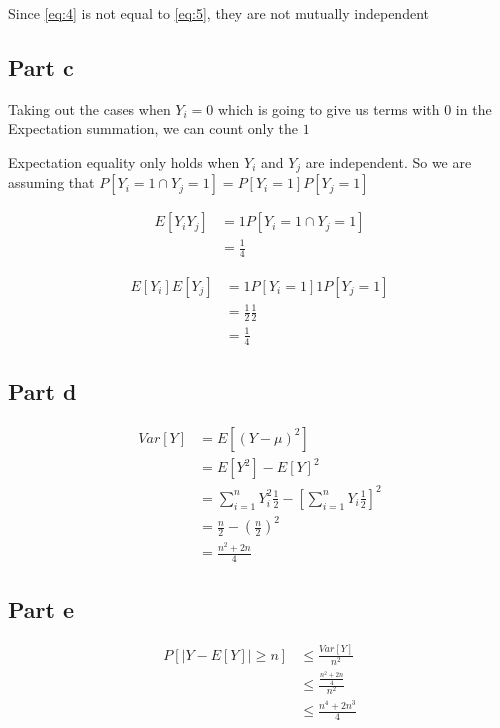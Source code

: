 \documentclass[12pt, a4paper]{article}
\begin{document}
Since \ref{eq:4} is not equal to \ref{eq:5}, they are not mutually independent

\subsection{Part c}
Taking out the cases when $Y_i = 0$ which is going to give us terms with $0$ in
the Expectation summation, we can count only the $1$

Expectation equality only holds when $Y_i$ and $Y_j$ are independent. So we are
assuming that $P[Y_i = 1 \cap Y_j = 1] = P[Y_i = 1]P[Y_j = 1]$

\begin{subequations}
  \begin{align}
    E[Y_iY_j] &= 1 P[Y_i=1 \cap Y_j=1]\\
              &= \frac{1}{4} \label{eq:6}
 \end{align}
\end{subequations}


\begin{subequations}
  \begin{align}
    E[Y_i]E[Y_j] &= 1 P[Y_i=1] 1 P[Y_j=1]\\
                 &= \frac{1}{2}\frac{1}{2}\\
                 &= \frac{1}{4} \label{eq:7}
  \end{align}
\end{subequations}

\subsection{Part d}

\begin{subequations}
  \begin{align}
    Var[Y] &= E[(Y - \mu)^2]\\
           &= E[Y^2] - E[Y]^2\\
           &= \sum_{i=1}^n Y_i^2\frac{1}{2} - \left[ \sum_{i=1}^n Y_i\frac{1}{2} \right]^2\\
           &= \frac{n}{2} - \left( \frac{n}{2} \right)^2 \\
           &= \frac{n^2 + 2n}{4}
  \end{align}
\end{subequations}

\subsection{Part e}
\begin{subequations}
  \begin{align}
    P[\mid Y - E[Y] \mid \geq n] &\leq \frac{Var[Y]}{n^2}\\
                               &\leq \frac{\frac{n^2 + 2n}{4}}{n^2}\\
                               &\leq \frac{n^4 + 2n^3}{4} 
  \end{align}
\end{subequations}
\end{document}
